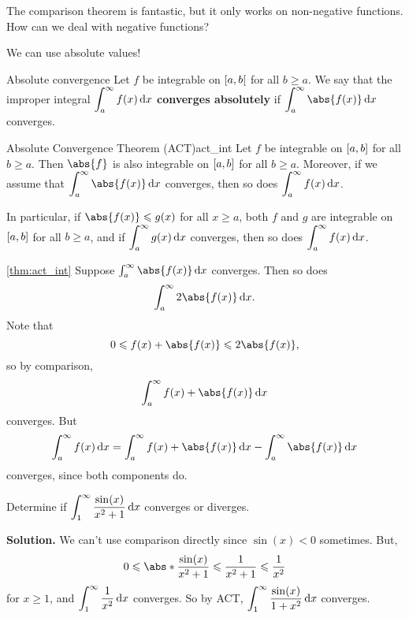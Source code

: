 The comparison theorem is fantastic, but it only works on non-negative functions. How
can we deal with negative functions?

We can use absolute values!

\begin{Definition}{Absolute convergence}{}
    Let $ f $ be integrable on $ \interval[open right]{a}{b} $ for all $ b\geqslant a $.
    We say that the improper integral $ \displaystyle \int_{a}^{\infty} f(x)\odif{x} $
    \textbf{converges absolutely} if
    $ \displaystyle \int_{a}^{\infty} \abs{f(x)}\odif{x} $
    converges.
\end{Definition}

\begin{Theorem}{Absolute Convergence Theorem (ACT)}{act_int}
    Let $ f $ be integrable on $ \interval{a}{b} $ for all $ b\geqslant a $.
    Then $ \abs{f} $ is also integrable on $ \interval{a}{b} $ for all $ b\geqslant a $.
    Moreover, if we assume that
    $ \displaystyle \int_{a}^{\infty} \abs{f(x)}\odif{x} $
    converges, then so does
    $ \displaystyle  \int_{a}^{\infty} f(x)\odif{x} $.

    In particular, if $ \abs{f(x)}\leqslant g(x) $ for all $ x\geqslant a $,
    both $ f $ and $ g $ are integrable on $ \interval{a}{b} $ for all $ b\geqslant a $,
    and if $ \displaystyle \int_{a}^{\infty} g(x)\odif{x}  $ converges, then so does
    $ \displaystyle \int_{a}^{\infty} f(x)\odif{x} $.
\end{Theorem}

\begin{Proof}{\ref{thm:act_int}}{}
    Suppose $ \int_{a}^{\infty} \abs{f(x)}\odif{x} $ converges. Then so does
    \[ \int_{a}^{\infty} 2\abs{f(x)}\odif{x}. \]
    Note that
    \[ 0\leqslant f(x)+\abs{f(x)}\leqslant 2\abs{f(x)}, \]
    so by comparison,
    \[ \int_{a}^{\infty} f(x)+\abs{f(x)}\odif{x} \]
    converges. But
    \[ \int_{a}^{\infty} f(x)\odif{x} =\int_{a}^{\infty} f(x)+\abs{f(x)}\odif{x} -
        \int_{a}^{\infty} \abs{f(x)}\odif{x}  \]
    converges, since both components do.
\end{Proof}

\begin{Example}{}{}
    Determine if $ \displaystyle \int_{1}^{\infty} \frac{\sin(x)}{x^2+1} \odif{x} $
    converges or diverges.

    \textbf{Solution.}
    We can't use comparison directly since $ \sin(x)<0 $ sometimes. But,
    \[ \displaystyle  0\leqslant \abs*{\frac{\sin(x)}{x^2+1} }\leqslant \frac{1}{x^2+1}
        \leqslant \frac{1}{x^2} \]
    for $ x\geqslant 1 $, and $ \displaystyle \int_{1}^{\infty} \frac{1}{x^2} \odif{x}  $ converges. So by
    ACT, $ \displaystyle \int_{1}^{\infty} \frac{\sin(x)}{1+x^2} \odif{x}  $ converges.
\end{Example}

